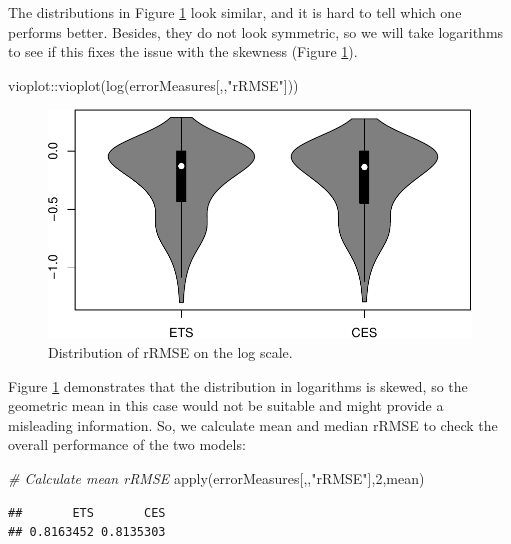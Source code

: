 \documentclass[
]{book}
\newenvironment{Shaded}{\begin{snugshade}}{\end{snugshade}}
\newcommand{\CommentTok}[1]{\textcolor[rgb]{0.56,0.35,0.01}{\textit{#1}}}
\newcommand{\DecValTok}[1]{\textcolor[rgb]{0.00,0.00,0.81}{#1}}
\newcommand{\FunctionTok}[1]{\textcolor[rgb]{0.00,0.00,0.00}{#1}}
\newcommand{\NormalTok}[1]{#1}
\newcommand{\SpecialCharTok}[1]{\textcolor[rgb]{0.00,0.00,0.00}{#1}}
\newcommand{\StringTok}[1]{\textcolor[rgb]{0.31,0.60,0.02}{#1}}
\theoremstyle{definition}
\theoremstyle{definition}
\theoremstyle{definition}
\theoremstyle{definition}
\theoremstyle{remark}
\begin{document}
The distributions in Figure \ref{fig:errorMeasuresrRMSEDistLog} look similar, and it is hard to tell which one performs better. Besides, they do not look symmetric, so we will take logarithms to see if this fixes the issue with the skewness (Figure \ref{fig:errorMeasuresrRMSEDistLog}).

\begin{Shaded}
\begin{Highlighting}[]
\NormalTok{vioplot}\SpecialCharTok{::}\FunctionTok{vioplot}\NormalTok{(}\FunctionTok{log}\NormalTok{(errorMeasures[,,}\StringTok{"rRMSE"}\NormalTok{]))}
\end{Highlighting}
\end{Shaded}

\begin{figure}
\centering
\includegraphics{Svetunkov--2022----ADAM_files/figure-latex/errorMeasuresrRMSEDistLog-1.pdf}
\caption{\label{fig:errorMeasuresrRMSEDistLog}Distribution of rRMSE on the log scale.}
\end{figure}

Figure \ref{fig:errorMeasuresrRMSEDistLog} demonstrates that the distribution in logarithms is skewed, so the geometric mean in this case would not be suitable and might provide a misleading information. So, we calculate mean and median rRMSE to check the overall performance of the two models:

\begin{Shaded}
\begin{Highlighting}[]
\CommentTok{\# Calculate mean rRMSE}
\FunctionTok{apply}\NormalTok{(errorMeasures[,,}\StringTok{"rRMSE"}\NormalTok{],}\DecValTok{2}\NormalTok{,mean)}
\end{Highlighting}
\end{Shaded}

\begin{verbatim}
##       ETS       CES 
## 0.8163452 0.8135303
\end{verbatim}
\end{document}
